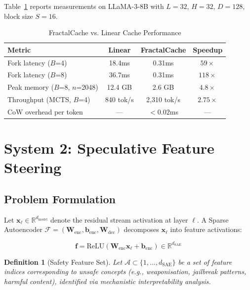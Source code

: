 \documentclass[10pt,twocolumn]{article}
\newtheorem{definition}{Definition}
\begin{document}
Table~\ref{tab:fractalcache} reports measurements on LLaMA-3-8B with $L=32$, $H=32$, $D=128$, block size $S=16$.

\begin{table}[h]
\centering
\caption{FractalCache vs. Linear Cache Performance}
\label{tab:fractalcache}
\begin{tabular}{@{}lccc@{}}
\toprule
\textbf{Metric} & \textbf{Linear} & \textbf{FractalCache} & \textbf{Speedup} \\
\midrule
Fork latency ($B$=4) & 18.4ms & 0.31ms & $59\times$ \\
Fork latency ($B$=8) & 36.7ms & 0.31ms & $118\times$ \\
Peak memory ($B$=8, $n$=2048) & 12.4 GB & 2.6 GB & $4.8\times$ \\
Throughput (MCTS, $B$=4) & 840 tok/s & 2,310 tok/s & $2.75\times$ \\
CoW overhead per token & — & $<0.02$ms & — \\
\bottomrule
\end{tabular}
\end{table}

\section{System 2: Speculative Feature Steering}

\subsection{Problem Formulation}

Let $\mathbf{x}_\ell \in \mathbb{R}^{d_{\text{model}}}$ denote the residual stream activation at layer $\ell$. A Sparse Autoencoder $\mathcal{F} = (\mathbf{W}_{\text{enc}}, \mathbf{b}_{\text{enc}}, \mathbf{W}_{\text{dec}})$ decomposes $\mathbf{x}_\ell$ into feature activations:

\begin{equation}
\mathbf{f} = \text{ReLU}(\mathbf{W}_{\text{enc}} \mathbf{x}_\ell + \mathbf{b}_{\text{enc}}) \in \mathbb{R}^{d_{\text{SAE}}}
\end{equation}

\begin{definition}[Safety Feature Set]
Let $\mathcal{A} \subset \{1, \ldots, d_{\text{SAE}}\}$ be a set of feature indices corresponding to unsafe concepts (e.g., weaponisation, jailbreak patterns, harmful content), identified via mechanistic interpretability analysis.
\end{definition}
\end{document}
